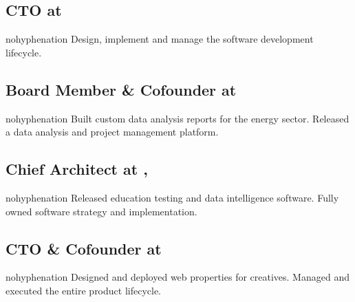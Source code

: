 \fullwidthmode
{
\subsection{\textbf{CTO} at  \shyears{[2015-PRESENT]}}
\begin{sloppypar}\begin{hyphenrules}{nohyphenation}
\small{Design, implement and manage the software development lifecycle.}
\end{hyphenrules}\end{sloppypar}
\medskip

\subsection{\textbf{Board Member \& Cofounder} at  \shyears{[2011-PRESENT]}}
\begin{sloppypar}\begin{hyphenrules}{nohyphenation}
\small{Built custom data analysis reports for the energy sector.  Released a data analysis and project management platform.}
\end{hyphenrules}\end{sloppypar}
\medskip

\subsection{\textbf{Chief Architect} at ,  \shyears{[2008-2014]}}
\begin{sloppypar}\begin{hyphenrules}{nohyphenation}
\small{Released education testing and data intelligence software.  Fully owned software strategy and implementation.}
\end{hyphenrules}\end{sloppypar}
\medskip

\subsection{\textbf{CTO \& Cofounder} at  \shyears{[2006-2008]}}
\begin{sloppypar}\begin{hyphenrules}{nohyphenation}
\small{Designed and deployed web properties for creatives.  Managed and executed the entire product lifecycle.}
\end{hyphenrules}\end{sloppypar}
\medskip

}
